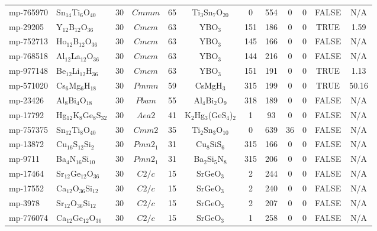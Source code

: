 {\begin{longtable}{llcccccccccc}
    mp-765970 & Sn$_{14}$Ti$_{6}$O$_{40}$ & 30    & $Cmmm$ & 65    & Ti$_{3}$Sn$_{7}$O$_{20}$ & 0     & 554   & 0     & 0     & FALSE & N/A \\
    mp-29205 & Y$_{12}$B$_{12}$O$_{36}$ & 30    & $Cmcm$ & 63    & YBO$_{3}$ & 151   & 186   & 0     & 0     & TRUE  & 1.59  \\
    mp-752713 & Ho$_{12}$B$_{12}$O$_{36}$ & 30    & $Cmcm$ & 63    & YBO$_{3}$ & 145   & 166   & 0     & 0     & FALSE & N/A \\
    mp-768518 & Al$_{12}$La$_{12}$O$_{36}$ & 30    & $Cmcm$ & 63    & YBO$_{3}$ & 144   & 216   & 0     & 0     & FALSE & N/A \\
    mp-977148 & Be$_{12}$Li$_{12}$H$_{36}$ & 30    & $Cmcm$ & 63    & YBO$_{3}$ & 151   & 191   & 0     & 0     & TRUE  & 1.13  \\
    mp-571020 & Cs$_{6}$Mg$_{6}$H$_{18}$ & 30    & $Pmmn$ & 59    & CsMgH$_{3}$ & 315   & 199   & 0     & 0     & TRUE  & 50.16  \\
    mp-23426 & Al$_{8}$Bi$_{4}$O$_{18}$ & 30    & $Pbam$ & 55    & Al$_{4}$Bi$_{2}$O$_{9}$ & 318   & 189   & 0     & 0     & FALSE & N/A \\
    mp-17792 & Hg$_{12}$K$_{8}$Ge$_{8}$S$_{32}$ & 30    & $Aea2$ & 41    & K$_{2}$Hg$_{3}$(GeS$_{4}$)$_{2}$ & 1     & 93    & 0     & 0     & FALSE & N/A \\
    mp-757375 & Sn$_{12}$Ti$_{8}$O$_{40}$ & 30    & $Cmm2$ & 35    & Ti$_{2}$Sn$_{3}$O$_{10}$ & 0     & 639   & 36    & 0     & FALSE & N/A \\
    mp-13872 & Cu$_{16}$S$_{12}$Si$_{2}$ & 30    & $Pmn2_1$ & 31    & Cu$_{8}$SiS$_{6}$ & 315   & 166   & 0     & 0     & FALSE & N/A \\
    mp-9711 & Ba$_{4}$N$_{16}$Si$_{10}$ & 30    & $Pmn2_1$ & 31    & Ba$_{2}$Si$_{5}$N$_{8}$ & 315   & 206   & 0     & 0     & FALSE & N/A \\
    mp-17464 & Sr$_{12}$Ge$_{12}$O$_{36}$ & 30    & $C2/c$ & 15    & SrGeO$_{3}$ & 2     & 244   & 0     & 0     & FALSE & N/A \\
    mp-17552 & Ca$_{12}$O$_{36}$Si$_{12}$ & 30    & $C2/c$ & 15    & SrGeO$_{3}$ & 2     & 240   & 0     & 0     & FALSE & N/A \\
    mp-3978 & Sr$_{12}$O$_{36}$Si$_{12}$ & 30    & $C2/c$ & 15    & SrGeO$_{3}$ & 2     & 207   & 0     & 0     & FALSE & N/A \\
    mp-776074 & Ca$_{12}$Ge$_{12}$O$_{36}$ & 30    & $C2/c$ & 15    & SrGeO$_{3}$ & 1     & 258   & 0     & 0     & FALSE & N/A \\

\end{longtable}}
